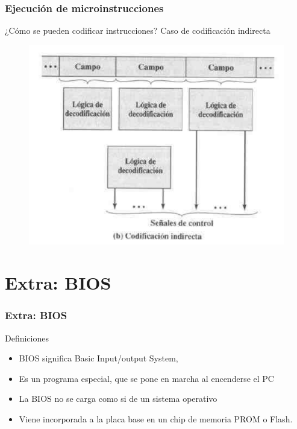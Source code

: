 \documentclass{beamer}
\begin{document}
\begin{frame}
	\frametitle{Ejecución de microinstrucciones}
	\begin{block}{¿Cómo se pueden codificar instrucciones?}
	Caso de codificación indirecta
	\end{block}	
	\begin{figure}[H]
		\centering
		\includegraphics[scale=0.3]{imagenes/indirecta.png} 
	\end{figure}
\end{frame}
 
\section{Extra: BIOS} 

\begin{frame}
	\frametitle{Extra: BIOS}
	\begin{block}{Definiciones}
	\begin{itemize}
		\item BIOS significa Basic Input/output System,
		\item Es un programa especial, que se pone en marcha al encenderse el PC
		\item La BIOS no se carga como si de un sistema operativo 
		\item Viene incorporada a la placa base en un chip de memoria PROM o Flash.
	\end{itemize}
	\end{block}	
\end{frame}
\end{document}
